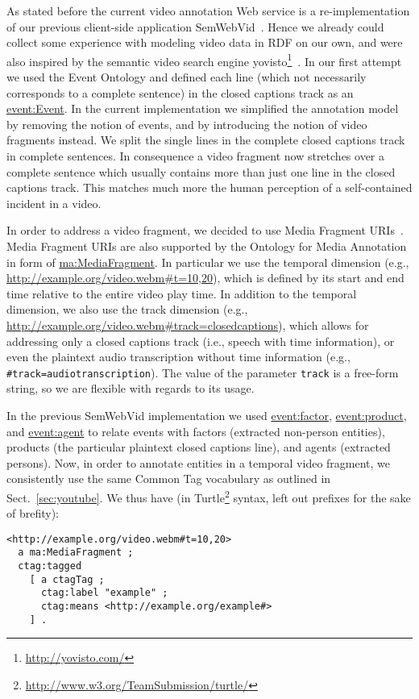 \documentclass{acm_proc_article-sp}
\begin{document}
As stated before the current video annotation Web service is a re-implementation of our previous client-side application SemWebVid~\cite{Steiner:SemWebVid}. Hence we already could collect some experience with modeling video data in RDF on our own, and were also inspired by the semantic video search engine yovisto\footnote{\url{http://yovisto.com/}}~\cite{Sack:Use, Sack:VideoSearch}. In our first attempt we used the Event Ontology\cite{Raimond:Event} and defined each line (which not necessarily corresponds to a complete sentence) in the closed captions track as an \url{event:Event}. In the current implementation we simplified the annotation model by removing the notion of events, and by introducing the notion of video fragments instead. We split the single lines in the complete closed captions track in complete sentences. In consequence a video fragment now stretches over a complete sentence which usually contains more than just one line in the closed captions track. This matches much more the human perception of a self-contained incident in a video. 

In order to address a video fragment, we decided to use Media Fragment URIs~\cite{W3C:MediaFrags}. Media Fragment URIs are also supported by the Ontology for Media Annotation in form of \url{ma:MediaFragment}. In particular we use the temporal dimension (e.g., \url{http://example.org/video.webm#t=10,20}), which is defined by its start and end time relative to the entire video play time. In addition to the temporal dimension, we also use the track dimension (e.g., \url{http://example.org/video.webm#track=closedcaptions}), which allows for addressing only a closed captions track (i.e., speech with time information), or even the plaintext audio transcription without time information (e.g., \texttt{\#track=audiotranscription}). The value of the parameter \texttt{track} is a free-form string, so we are flexible with regards to its usage.

In the previous SemWebVid implementation we used \url{event:factor}, \url{event:product}, and \url{event:agent} to relate events with factors (extracted non-person entities), products (the particular plaintext closed captions line), and agents (extracted persons). Now, in order to annotate entities in a temporal video fragment, we consistently use the same Common Tag vocabulary as outlined in Sect.~\ref{sec:youtube}. We thus have (in Turtle\footnote{\url{http://www.w3.org/TeamSubmission/turtle/}} syntax, left out prefixes for the sake of brefity):
\begin{lstlisting}
<http://example.org/video.webm#t=10,20> 
  a ma:MediaFragment ;
  ctag:tagged 
    [ a ctagTag ;
      ctag:label "example" ;
      ctag:means <http://example.org/example#>
    ] .
\end{lstlisting}
\end{document}
